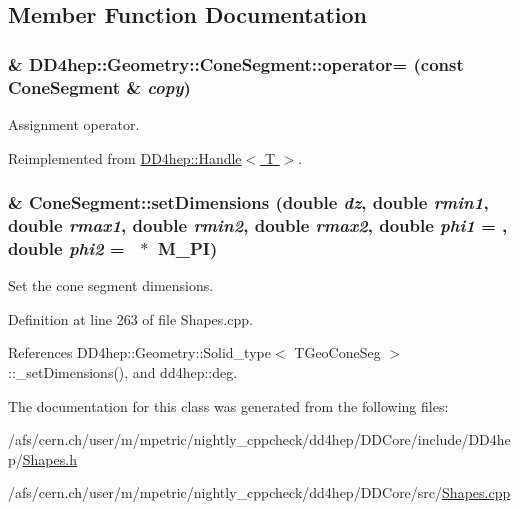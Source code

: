 \subsection{Member Function Documentation}
\hypertarget{class_d_d4hep_1_1_geometry_1_1_cone_segment_a3645d72628a714d02b81ac229683f3b8}{
\subsubsection[{operator=}]{\& DD4hep::Geometry::ConeSegment::operator= (const {\bf ConeSegment} \& {\em copy})}}
\label{class_d_d4hep_1_1_geometry_1_1_cone_segment_a3645d72628a714d02b81ac229683f3b8}


Assignment operator. 

Reimplemented from \hyperlink{class_d_d4hep_1_1_handle_a9bbf8f498df42e81ad26fb00233505a6}{DD4hep::Handle$<$ T $>$}.\hypertarget{class_d_d4hep_1_1_geometry_1_1_cone_segment_a1c5563e5b474583f16caf12a4d3f7834}{
\subsubsection[{setDimensions}]{ \& ConeSegment::setDimensions (double {\em dz}, \/  double {\em rmin1}, \/  double {\em rmax1}, \/  double {\em rmin2}, \/  double {\em rmax2}, \/  double {\em phi1} = {}, \/  double {\em phi2} = {~$\ast$~M\_\-PI})}}
\label{class_d_d4hep_1_1_geometry_1_1_cone_segment_a1c5563e5b474583f16caf12a4d3f7834}


Set the cone segment dimensions. 

Definition at line 263 of file Shapes.cpp.

References DD4hep::Geometry::Solid\_\-type$<$ TGeoConeSeg $>$::\_\-setDimensions(), and dd4hep::deg.

The documentation for this class was generated from the following files:\begin{DoxyCompactItemize}
\item 
/afs/cern.ch/user/m/mpetric/nightly\_\-cppcheck/dd4hep/DDCore/include/DD4hep/\hyperlink{_shapes_8h}{Shapes.h}\item 
/afs/cern.ch/user/m/mpetric/nightly\_\-cppcheck/dd4hep/DDCore/src/\hyperlink{_shapes_8cpp}{Shapes.cpp}\end{DoxyCompactItemize}
